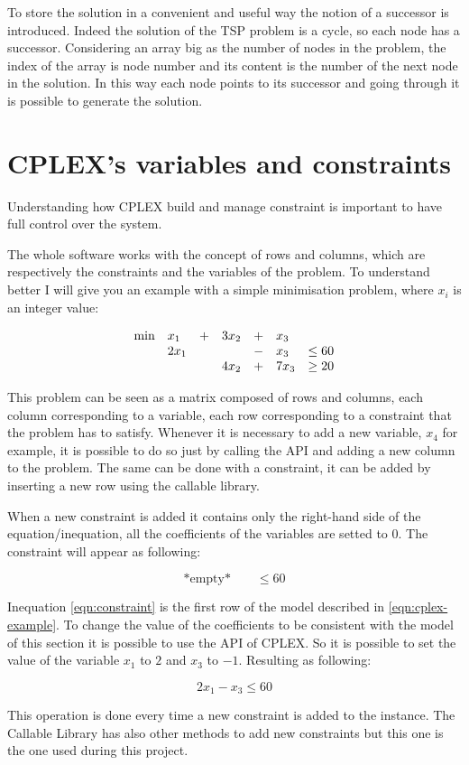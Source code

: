 To store the solution in a convenient and useful way the notion of a successor is introduced. Indeed the solution of the TSP problem is a cycle, so each node has a successor. Considering an array big as the number of nodes in the problem, the index of the array is node number and its content is the number of the next node in the solution. In this way each node points to its successor and going through it is possible to generate the solution.

\section{CPLEX's variables and constraints}
Understanding how CPLEX build and manage constraint is important to have full control over the system. 

The whole software works with the concept of rows and columns, which are respectively the constraints and the variables of the problem. To understand better I will give you an example with a simple minimisation problem, where $x_i$ is an integer value:

\begin{equation}
\label{eqn:cplex-example}
\begin{array}{lllllll}%
\text{min}  &x_1 	&+ 	& 3x_2 &+ & x_3\\
&  2x_1 &  	&   &- &x_3 &\le 60\\
&		&	& 4x_2 & + &7x_3 &\ge 20\\
\end{array}\\
\end{equation}

This problem can be seen as a matrix composed of rows and columns, each column corresponding to a variable, each row corresponding to a constraint that the problem has to satisfy. Whenever it is necessary to add a new variable, $x_4$ for example, it is possible to do so just by calling the API and adding a new column to the problem. The same can be done with a constraint, it can be added by inserting a new row using the callable library.

When a new constraint is added it contains only the right-hand side of the equation/inequation, all the coefficients of the variables are setted to 0. The constraint will appear as following:

\begin{equation}
\label{eqn:constraint}
\text{*empty*} \qquad \le 60
\end{equation}

Inequation \ref{eqn:constraint} is the first row of the model described in \ref{eqn:cplex-example}.
To change the value of the coefficients to be consistent with the model of this section it is possible to use the API of CPLEX. So it is possible to set the value of the variable $x_1$ to $2$ and $x_3$ to $-1$. Resulting as following: 

\begin{equation}
\label{eqn:full-constraint}
2x_1-x_3 \le 60
\end{equation}

This operation is done every time a new constraint is added to the instance.
The Callable Library has also other methods to add new constraints but this one is the one used during this project.